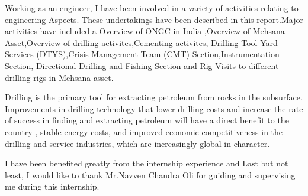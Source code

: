 \documentclass[11pt,a4paper]{report}
\makeatletter
\newcommand\mainmatter{%
    \cleardoublepage
  \pagenumbering{arabic}}
\makeatother
\begin{document}
Working as  an engineer, I  have been  involved  in  a variety of activities  relating to engineering Aspects.
These  undertakings have been  described  in this  report.Major activities  have  included a Overview of ONGC 
in India ,Overview of Mehsana Asset,Overview of drilling activites,Cementing activites,
Drilling Tool Yard Services (DTYS),Crisis Management Team (CMT) Section,Instrumentation Section, 
Directional Drilling and Fishing Section and Rig Visits to different drilling rigs in Mehsana asset.

\vspace{1em}

Drilling is the primary tool for extracting petroleum from rocks in the subsurface. Improvements in 
drilling technology that lower drilling costs and increase the rate of success in finding and extracting
petroleum will have a direct benefit to the country , stable energy 
costs, and improved economic competitiveness in the drilling and service industries, which are increasingly 
global in character. 

\vspace{1em}

I have been benefited greatly  from the internship experience and Last but not least,
I would like to thank Mr.Navven Chandra Oli for guiding  and supervising me during this internship. 


\newpage

\listoftables

\setlength{\voffset}{-1in}



\listoffigures



\mainmatter

\singlespacing




















\end{document}
